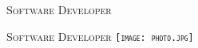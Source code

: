 \documentclass[10pt, a4paper]{article}
\begin{document}
\begin{paracol}{2}
    \raggedright
    \Huge \scshape Software Developer
    
    \vspace{0.5cm}
    \huge \scshape Software Developer
    \switchcolumn
    \raggedleft
    \texttt{[image: photo.jpg]}
\end{paracol}
\end{document}
